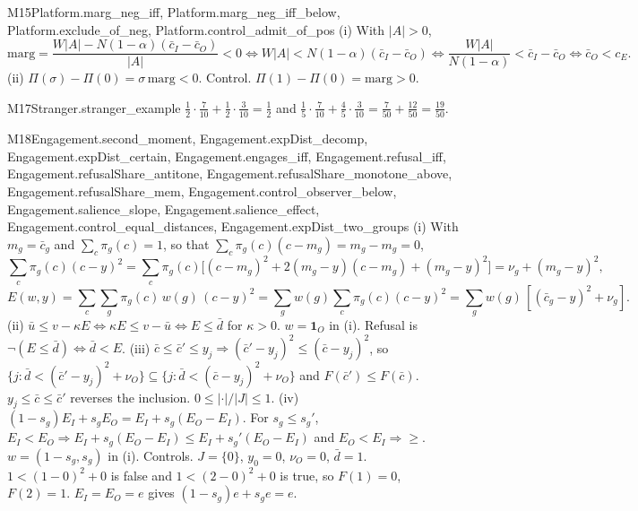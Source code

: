 \begin{mproof}{M15}{Platform.marg_neg_iff, Platform.marg_neg_iff_below, Platform.exclude_of_neg, Platform.control_admit_of_pos}
(i) With $|A|>0$,
\[
\mathrm{marg}=\frac{W|A|-N(1-\alpha)(\bar c_I-\bar c_O)}{|A|}<0
\iff W|A|<N(1-\alpha)(\bar c_I-\bar c_O)
\iff\frac{W|A|}{N(1-\alpha)}<\bar c_I-\bar c_O
\iff\bar c_O<c_E .
\]
(ii) $\Pi(\sigma)-\Pi(0)=\sigma\,\mathrm{marg}<0$.
Control. $\Pi(1)-\Pi(0)=\mathrm{marg}>0$.
\end{mproof}


\begin{mproof}{M17}{Stranger.stranger_example}
$\tfrac12\cdot\tfrac7{10}+\tfrac12\cdot\tfrac3{10}=\tfrac12$ and
$\tfrac15\cdot\tfrac7{10}+\tfrac45\cdot\tfrac3{10}=\tfrac{7}{50}+\tfrac{12}{50}=\tfrac{19}{50}$.
\end{mproof}

\begin{mproof}{M18}{Engagement.second_moment, Engagement.expDist_decomp, Engagement.expDist_certain, Engagement.engages_iff, Engagement.refusal_iff, Engagement.refusalShare_antitone, Engagement.refusalShare_monotone_above, Engagement.refusalShare_mem, Engagement.control_observer_below, Engagement.salience_slope, Engagement.salience_effect, Engagement.control_equal_distances, Engagement.expDist_two_groups}
(i) With $m_g=\bar c_g$ and $\sum_c\pi_g(c)=1$, so that
$\sum_c\pi_g(c)(c-m_g)=m_g-m_g=0$,
\[
\sum_c\pi_g(c)(c-y)^2
=\sum_c\pi_g(c)\big[(c-m_g)^2+2(m_g-y)(c-m_g)+(m_g-y)^2\big]
=\nu_g+(m_g-y)^2 ,
\]
\[
E(w,y)=\sum_c\sum_g\pi_g(c)\,w(g)\,(c-y)^2
=\sum_g w(g)\sum_c\pi_g(c)(c-y)^2
=\sum_g w(g)\,[(\bar c_g-y)^2+\nu_g].
\]
(ii) $\bar u\le v-\kappa E\iff\kappa E\le v-\bar u\iff E\le\bar d$ for
$\kappa>0$. $w=\mathbf 1_O$ in (i). Refusal is $\neg(E\le\bar d)\iff\bar d<E$.
(iii) $\bar c\le\bar c'\le y_j\Rightarrow(\bar c'-y_j)^2\le(\bar c-y_j)^2$, so
$\{j:\bar d<(\bar c'-y_j)^2+\nu_O\}\subseteq\{j:\bar d<(\bar c-y_j)^2+\nu_O\}$
and $F(\bar c')\le F(\bar c)$. $y_j\le\bar c\le\bar c'$ reverses the
inclusion. $0\le|\cdot|/|J|\le1$.
(iv) $(1-s_g)E_I+s_gE_O=E_I+s_g(E_O-E_I)$. For $s_g\le s_g'$,
$E_I<E_O\Rightarrow E_I+s_g(E_O-E_I)\le E_I+s_g'(E_O-E_I)$ and
$E_O<E_I\Rightarrow\ge$. $w=(1-s_g,s_g)$ in (i).
Controls. $J=\{0\}$, $y_0=0$, $\nu_O=0$, $\bar d=1$. $1<(1-0)^2+0$ is false
and $1<(2-0)^2+0$ is true, so $F(1)=0$, $F(2)=1$. $E_I=E_O=e$ gives
$(1-s_g)e+s_ge=e$.
\end{mproof}

